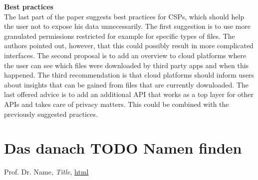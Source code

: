 \documentclass[11pt,twocolumn,a4paper,DIV=calc]{scrartcl}
\begin{document}
\textbf{Best practices} \\
The last part of the paper suggests best practices for CSPs, which should help the user not to expose his data unnecessarily. The first suggestion is to use more granulated permissions restricted for example for specific types of files. The authors pointed out, however, that this could possibly result in more complicated interfaces. The second proposal is to add an overview to cloud platforms where the user can see which files were downloaded by third party apps and when this happened. The third recommendation is that cloud platforms should inform users about insights that can be gained from files that are currently downloaded. The last offered advice is to add an additional API that works as a top layer for other APIs and takes care of privacy matters. This could be combined with the previously suggested practices.
\section{Das danach TODO Namen finden}
\begin{thebibliography}{99}
  Prof. Dr. Name, \emph{Title}, \url{html}
\end{thebibliography}
\end{document}
